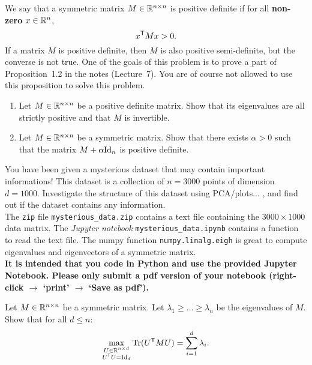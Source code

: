 \documentclass[11pt,nocut]{article}
\begin{document}
\begin{problem}[3 points]
	We say that a symmetric matrix $M \in \mathbb{R}^{n \times n}$ is positive definite if for all \textbf{non-zero} $x \in \mathbb{R}^n$,
	$$
	x^{{\sf T}} M x > 0.
	$$
	If a matrix $M$ is positive definite, then $M$ is also positive semi-definite, but the converse is not true. One of the goals of this problem is to prove a part of Proposition~1.2 in the notes (Lecture~7). You are of course not allowed to use this proposition to solve this problem.
	\begin{enumerate}[label=\normalfont(\textbf{\alph*})]
		\item Let $M \in \mathbb{R}^{n \times n}$ be a positive definite matrix. Show that its eigenvalues are all strictly positive and that $M$ is invertible. 
		\item Let $M \in \mathbb{R}^{n \times n}$ be a symmetric matrix. Show that there exists $\alpha > 0$ such that the matrix $M + \alpha {{\rm Id}}_n$ is positive definite.
	\end{enumerate}
\end{problem}

\vspace{1mm}


\begin{problem}[4 points]
	You have been given a mysterious dataset that may contain important informations! This dataset is a collection of $n=3000$ points of dimension $d=1000$.
	Investigate the structure of this dataset using PCA/plots... , and find out if the dataset contains any information.
	\\

	The \texttt{zip} file \texttt{mysterious\_data.zip} contains a text file containing the $3000 \times 1000$ data matrix.
	The \emph{Jupyter notebook} \texttt{mysterious\_data.ipynb} contains a function to read the text file.
	The numpy function \texttt{numpy.linalg.eigh} is great to compute eigenvalues and eigenvectors of a symmetric matrix.	
	\\

	\textbf{It is intended that you code in Python and use the provided Jupyter Notebook. Please only submit a pdf version of your notebook (right-click $\to$ `print' $\to$ `Save as pdf').}
\end{problem}


\vspace{1mm}




\begin{problem}[$\star$]
	Let $M \in \mathbb{R}^{n \times n}$ be a symmetric matrix. Let $\lambda_1 \geq \dots \geq \lambda_n$ be the eigenvalues of $M$. Show that for all $d \leq n$:
	$$
	\max_{\substack{U \in \mathbb{R}^{n\times d} \\ U^{{\sf T}} U = {{\rm Id}}_d}} {{\rm Tr}}(U^{{\sf T}} M U) = \sum_{i=1}^d \lambda_i.
	$$
\end{problem}
\vspace{1cm}
\centerline{}

%
%
\end{document}
